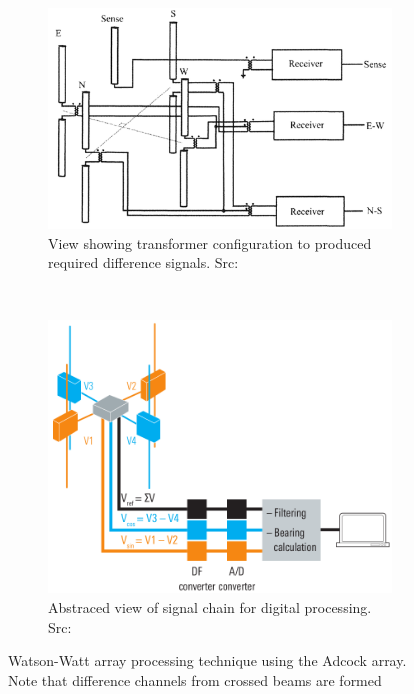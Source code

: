 \begin{figure}
  \centering
  \begin{subfigure}[b]{0.48\textwidth}
    \includegraphics[width=\textwidth]{./img/lit_review/watson-watt-processing-analogue}
    \caption{View showing transformer configuration to produced required difference signals. Src: \cite{poisel2008introduction}}
  \end{subfigure}
  ~
  \begin{subfigure}[b]{0.48\textwidth}
    \includegraphics[width=\textwidth]{./img/lit_review/watson-watt-processing-digital}
  \caption{Abstraced view of signal chain for digital processing. Src: \cite{rhode2000introtodf}}
  \end{subfigure}
  \caption{Watson-Watt array processing technique using the Adcock array. Note that difference channels from crossed beams are formed}
  \label{fig:watson-watt}
\end{figure}

